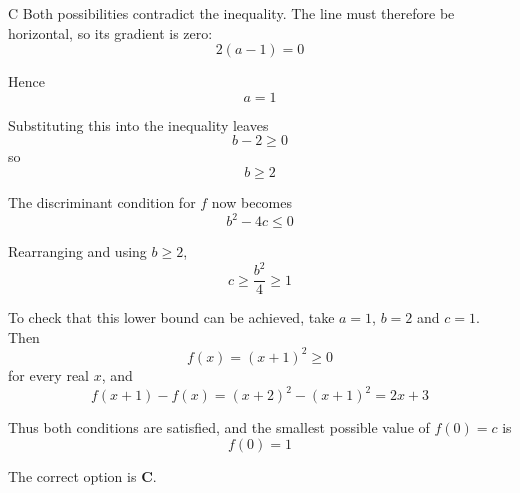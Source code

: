 \documentclass[11pt,a4paper]{article}
\begin{document}
\begin{enumerate}[label=\textbf{\arabic*.},leftmargin=*,itemsep=0pt,start=20]
\begin{djsSolution}{C}
Both possibilities contradict the inequality. The line must therefore be horizontal, so its gradient is zero:
\[
2(a-1)=0
\]

Hence
\[
a=1
\]

Substituting this into the inequality leaves
\[
b-2\geq0
\]
so
\[
b\geq2
\]

The discriminant condition for $f$ now becomes
\[
b^2-4c\leq0
\]

Rearranging and using $b\geq2$,
\[
c\geq\frac{b^2}{4}\geq1
\]

To check that this lower bound can be achieved, take $a=1$, $b=2$ and $c=1$. Then
\[
f(x)=(x+1)^2\geq0
\]
for every real $x$, and
\[
f(x+1)-f(x)=(x+2)^2-(x+1)^2=2x+3
\]

Thus both conditions are satisfied, and the smallest possible value of $f(0)=c$ is
\[
f(0)=1
\]

The correct option is \textbf{C}.
\end{djsSolution}
\end{enumerate}
\end{document}
